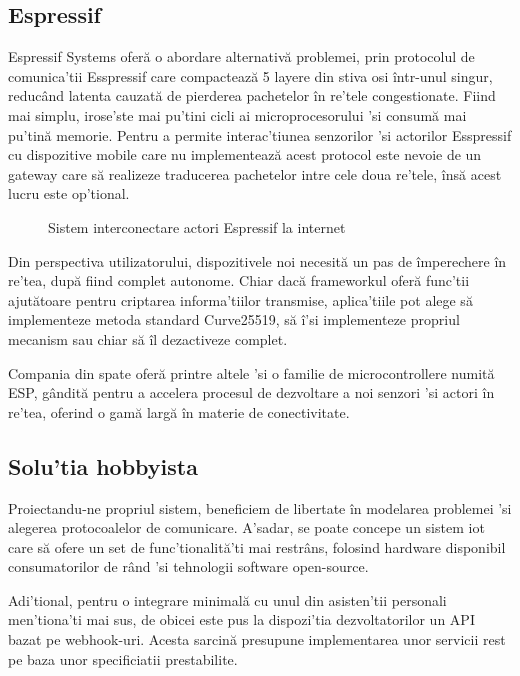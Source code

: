 \subsection {Espressif}

Espressif Systems oferă o abordare alternativă problemei, prin protocolul de comunica'tii Esspressif care compactează 5 layere din stiva \acrfull{osi} într-unul singur, reducând latenta cauzată de pierderea pachetelor în re'tele congestionate. Fiind mai simplu, irose'ste mai pu'tini cicli ai microprocesorului 'si consumă mai pu'tină memorie. Pentru a permite interac'tiunea senzorilor 'si actorilor Esspressif cu dispozitive mobile care nu implementează acest protocol este nevoie de un gateway care să realizeze traducerea pachetelor intre cele doua re'tele, însă acest lucru este op'tional.

\begin{figure}[h!]
  \centering
  \caption{Sistem interconectare actori Espressif la internet \cite{StackOverflow2021Espressif}}
\end{figure}

Din perspectiva utilizatorului, dispozitivele noi necesită un pas de împerechere în re'tea, după fiind complet autonome. Chiar dacă frameworkul oferă func'tii ajutătoare pentru criptarea informa'tiilor transmise, aplica'tiile pot alege să implementeze metoda standard Curve25519, să î'si implementeze propriul mecanism sau chiar să îl dezactiveze complet.

Compania din spate oferă printre altele 'si o familie de microcontrollere numită ESP, gândită pentru a accelera procesul de dezvoltare a noi senzori 'si actori în re'tea, oferind o gamă largă în materie de conectivitate.

\subsection {Solu'tia hobbyista}

Proiectandu-ne propriul sistem, beneficiem de libertate în modelarea problemei 'si alegerea protocoalelor de comunicare. A'sadar, se poate concepe un sistem \acrshort{iot} care să ofere un set de func'tionalită'ti mai restrâns, folosind hardware disponibil consumatorilor de rând 'si tehnologii software open-source.

Adi'tional, pentru o integrare minimală cu unul din asisten'tii personali men'tiona'ti mai sus, de obicei este pus la dispozi'tia dezvoltatorilor un API bazat pe webhook-uri. Acesta sarcină presupune implementarea unor servicii \acrshort{rest} pe baza unor specificiatii prestabilite. 

